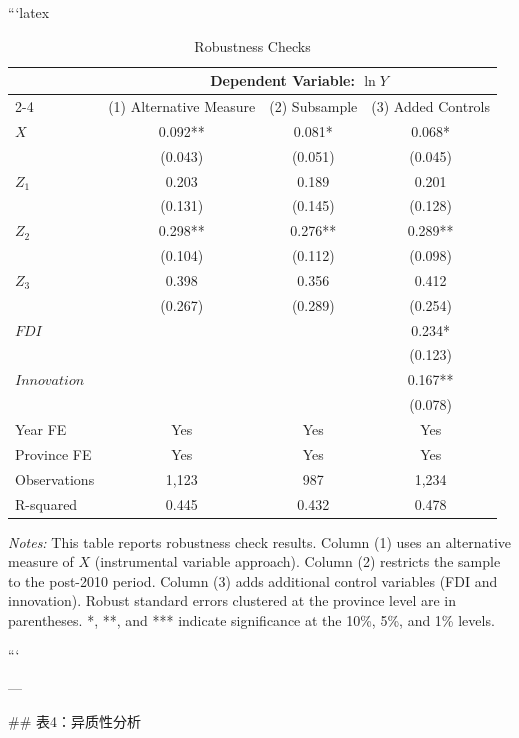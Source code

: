 ```latex
\begin{table}[htbp]
\centering
\caption{Robustness Checks}
\label{tab:robust}
\scriptsize
\begin{tabular}{lccc}
\toprule
 & \multicolumn{3}{c}{Dependent Variable: $\ln Y$} \\
\cmidrule(lr){2-4}
 & (1) Alternative Measure & (2) Subsample & (3) Added Controls \\
\midrule
$X$ & 0.092** & 0.081* & 0.068* \\
 & (0.043) & (0.051) & (0.045) \\
$Z_1$ & 0.203 & 0.189 & 0.201 \\
 & (0.131) & (0.145) & (0.128) \\
$Z_2$ & 0.298** & 0.276** & 0.289** \\
 & (0.104) & (0.112) & (0.098) \\
$Z_3$ & 0.398 & 0.356 & 0.412 \\
 & (0.267) & (0.289) & (0.254) \\
$FDI$ & & & 0.234* \\
 & & & (0.123) \\
$Innovation$ & & & 0.167** \\
 & & & (0.078) \\
\midrule
Year FE & Yes & Yes & Yes \\
Province FE & Yes & Yes & Yes \\
\midrule
Observations & 1,123 & 987 & 1,234 \\
R-squared & 0.445 & 0.432 & 0.478 \\
\bottomrule
\end{tabular}
\begin{minipage}{\linewidth}
\smallskip
\textit{Notes:} This table reports robustness check results. Column (1) uses an alternative measure of $X$ (instrumental variable approach). Column (2) restricts the sample to the post-2010 period. Column (3) adds additional control variables (FDI and innovation). Robust standard errors clustered at the province level are in parentheses. *, **, and *** indicate significance at the 10\%, 5\%, and 1\% levels.
\end{minipage}
\end{table}
```

---

## 表4：异质性分析

